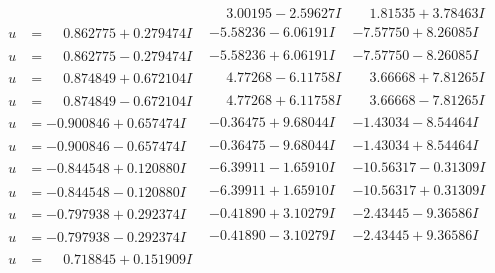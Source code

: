 \documentclass[1p]{elsarticle_modified}
\theoremstyle{definition}
\begin{document}
$$\begin{array}{c|c|c}
 & \phantom{-}3.00195 - 2.59627 I & \phantom{-}1.81535 + 3.78463 I \\ \hline\begin{aligned}
u &= \phantom{-}0.862775 + 0.279474 I\end{aligned}
 & -5.58236 - 6.06191 I & -7.57750 + 8.26085 I \\ \hline\begin{aligned}
u &= \phantom{-}0.862775 - 0.279474 I\end{aligned}
 & -5.58236 + 6.06191 I & -7.57750 - 8.26085 I \\ \hline\begin{aligned}
u &= \phantom{-}0.874849 + 0.672104 I\end{aligned}
 & \phantom{-}4.77268 - 6.11758 I & \phantom{-}3.66668 + 7.81265 I \\ \hline\begin{aligned}
u &= \phantom{-}0.874849 - 0.672104 I\end{aligned}
 & \phantom{-}4.77268 + 6.11758 I & \phantom{-}3.66668 - 7.81265 I \\ \hline\begin{aligned}
u &= -0.900846 + 0.657474 I\end{aligned}
 & -0.36475 + 9.68044 I & -1.43034 - 8.54464 I \\ \hline\begin{aligned}
u &= -0.900846 - 0.657474 I\end{aligned}
 & -0.36475 - 9.68044 I & -1.43034 + 8.54464 I \\ \hline\begin{aligned}
u &= -0.844548 + 0.120880 I\end{aligned}
 & -6.39911 - 1.65910 I & -10.56317 - 0.31309 I \\ \hline\begin{aligned}
u &= -0.844548 - 0.120880 I\end{aligned}
 & -6.39911 + 1.65910 I & -10.56317 + 0.31309 I \\ \hline\begin{aligned}
u &= -0.797938 + 0.292374 I\end{aligned}
 & -0.41890 + 3.10279 I & -2.43445 - 9.36586 I \\ \hline\begin{aligned}
u &= -0.797938 - 0.292374 I\end{aligned}
 & -0.41890 - 3.10279 I & -2.43445 + 9.36586 I \\ \hline\begin{aligned}
u &= \phantom{-}0.718845 + 0.151909 I\end{aligned}

\end{array}$$
\end{document}
